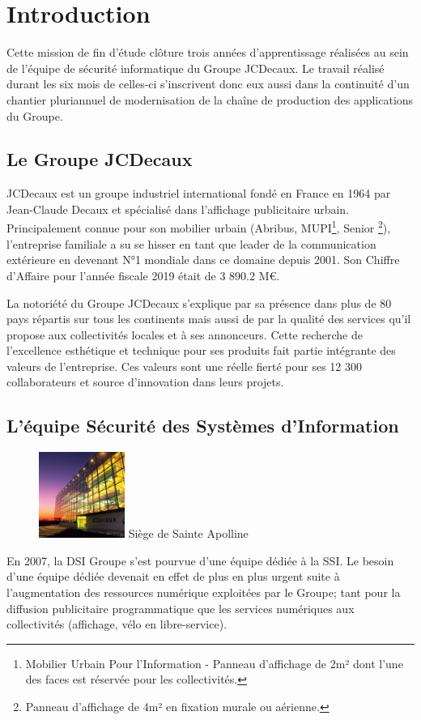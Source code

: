 \chapter{Introduction}
Cette mission de fin d'étude clôture trois années d'apprentissage réalisées au sein de l'équipe de sécurité informatique 
du Groupe JCDecaux. Le travail réalisé durant les six mois de celles-ci s'inscrivent donc eux aussi dans la continuité 
d'un chantier pluriannuel de modernisation de la chaîne de production des applications du Groupe.  


\section{Le Groupe JCDecaux}
JCDecaux est un groupe industriel international fondé en France en 1964 par Jean-Claude Decaux et spécialisé dans 
l'affichage publicitaire urbain. Principalement connue pour son mobilier urbain (Abribus, MUPI\footnote{Mobilier Urbain 
Pour l'Information - Panneau d'affichage de 2m² dont l'une des faces est réservée pour les collectivités.}, Senior
\footnote{Panneau d'affichage de 4m² en fixation murale ou aérienne.}), l'entreprise familiale a su se hisser en tant 
que leader de la communication extérieure en devenant N°1 mondiale dans ce domaine depuis 2001. 
\newline Son Chiffre d'Affaire pour l'année fiscale 2019 était de 3 890.2 M€.

La notoriété du Groupe JCDecaux s'explique par sa présence dans plus de 80 pays répartis sur tous les continents mais
aussi de par la qualité des services qu'il propose aux collectivités locales et à ses annonceurs.
\newline Cette recherche de l'excellence esthétique et technique pour ses produits fait partie intégrante des 
valeurs de l'entreprise. Ces valeurs sont une réelle fierté pour ses 12 300 collaborateurs et source d'innovation dans leurs
projets. 



\section{L'équipe Sécurité des Systèmes d'Information}
\begin{figure} 
    \centering \includegraphics[width=0.25\textwidth]{resources/img/jcd_pla_front.jpg}
    \centering Siège de Sainte Apolline
\end{figure}
En 2007, la \ac{DSI} Groupe s'est pourvue d'une équipe dédiée à la \ac{SSI}.
Le besoin d'une équipe dédiée devenait en effet de plus en plus urgent suite à l'augmentation des ressources numérique
exploitées par le Groupe; tant pour la diffusion publicitaire programmatique que les services numériques aux 
collectivités (affichage, vélo en libre-service).

